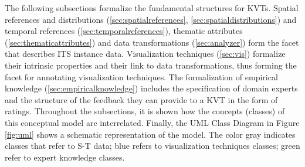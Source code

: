 \documentclass[]{interact}
\theoremstyle{plain}%
\theoremstyle{definition}
\theoremstyle{remark}
\theoremstyle{definition}
\begin{document}
The following subsections formalize the fundamental structures for KVTs. Spatial references and distributions (\ref{sec:spatialreferences}, \ref{sec:spatialdistributions}) and temporal references (\ref{sec:temporalreferences}), thematic attributes (\ref{sec:thematicattributes}) and data transformations (\ref{sec:analyzer}) form the facet that describes ITS instance data. Visualization techniques (\ref{sec:vis}) formalize their intrinsic properties and their link to data transformations, thus forming the facet for annotating visualization techniques. The formalization of empirical knowledge (\ref{sec:empiricalknowledge}) includes the specification of domain experts and the structure of the feedback they can provide to a KVT in the form of ratings. Throughout the subsections, it is shown how the concepts (classes) of this conceptual model are interrelated. Finally, the UML Class Diagram in Figure \ref{fig:uml} shows a schematic representation of the model. The color gray indicates classes that refer to S-T data; blue refers to visualization techniques classes; green refer to expert knowledge classes.





\end{document}
